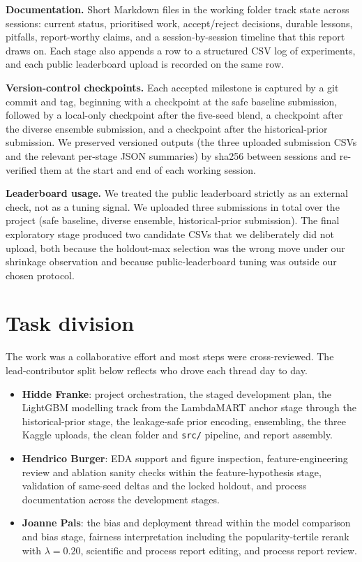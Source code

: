 \documentclass[a4paper,10pt]{article}
\begin{document}
\textbf{Documentation.} Short Markdown files in the working folder
track state across sessions: current status, prioritised work,
accept/reject decisions, durable lessons, pitfalls, report-worthy
claims, and a session-by-session timeline that this report draws
on. Each stage also appends a row to a structured CSV log of
experiments, and each public leaderboard upload is recorded on the
same row.

\textbf{Version-control checkpoints.} Each accepted milestone is
captured by a git commit and tag, beginning with a checkpoint at
the safe baseline submission, followed by a local-only checkpoint
after the five-seed blend, a checkpoint after the diverse ensemble
submission, and a checkpoint after the historical-prior submission.
We preserved versioned outputs (the three uploaded submission
CSVs and the relevant per-stage JSON summaries) by sha256 between
sessions and re-verified them at the start and end of each working
session.

\textbf{Leaderboard usage.} We treated the public leaderboard
strictly as an external check, not as a tuning signal. We uploaded
three submissions in total over the project (safe baseline,
diverse ensemble, historical-prior submission). The final
exploratory stage produced two candidate CSVs that we deliberately
did not upload, both because the holdout-max selection was the
wrong move under our shrinkage observation and because
public-leaderboard tuning was outside our chosen protocol.

\section*{Task division}

The work was a collaborative effort and most steps were
cross-reviewed. The lead-contributor split below reflects who
drove each thread day to day.

\begin{itemize}[leftmargin=*]
\item \textbf{Hidde Franke}: project orchestration, the staged
    development plan, the LightGBM modelling track from the
    LambdaMART anchor stage through the historical-prior stage,
    the leakage-safe prior encoding, ensembling, the three Kaggle
    uploads, the clean folder and \texttt{src/} pipeline, and
    report assembly.
\item \textbf{Hendrico Burger}: EDA support and figure inspection,
    feature-engineering review and ablation sanity checks within
    the feature-hypothesis stage, validation of same-seed deltas
    and the locked holdout, and process documentation across the
    development stages.
\item \textbf{Joanne Pals}: the bias and deployment thread within
    the model comparison and bias stage, fairness interpretation
    including the popularity-tertile rerank with $\lambda = 0.20$,
    scientific and process report editing, and process report
    review.
\end{itemize}
\end{document}

